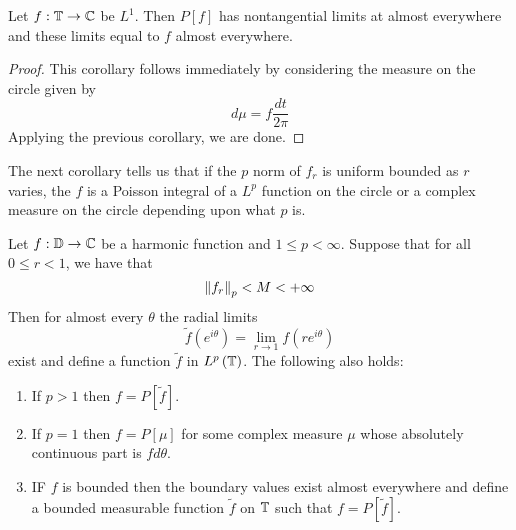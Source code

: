 \begin{corollary}
    Let $f : \mathbb T \to \mathbb C$ be $L^{1}$. Then $P[f]$ has nontangential limits at almost everywhere and these limits equal to $f$ almost everywhere.
    \label{cor:L1-implies-Poisson-limits}
\end{corollary}
\begin{proof}
    This corollary follows immediately by considering the measure on the circle given by
    \begin{equation*}
	d\mu = f \frac{dt}{2\pi}
    \end{equation*}
    Applying the previous corollary, we are done.
\end{proof}

The next corollary tells us that if the $p$ norm of $f_{r}$ is uniform bounded as $r$ varies, the $f$ is a Poisson integral of a $L^{p}$ function on the circle or a complex measure on the circle depending upon what $p$ is.
\begin{corollary}
    Let $f: \mathbb D \to \mathbb C$ be a harmonic function and $1\le p <\infty$. Suppose that for all $0\le r < 1$, we have that
    \begin{equation*}
	\left\lVert f_{r} \right\rVert_{p} < M< +\infty
    \end{equation*}
    Then for almost every $\theta$ the radial limits 
    \begin{equation*}
	\tilde {f} (e^{i\theta} ) = \lim_{r\to 1} f\left( re^{i\theta} \right)
    \end{equation*}
    exist and define a function $\tilde f$ in $L^{p} \left( \mathbb T \right)$. The following also holds:
    \begin{enumerate}
	\item If $p>1$ then $f=P[\tilde{f}]$.
	\item If $p=1$ then $f=P[\mu]$ for some complex measure $\mu$ whose absolutely continuous part is $fd\theta$.
	\item IF $f$ is bounded then the boundary values exist almost everywhere and define a bounded measurable function $\tilde{f}$ on $\mathbb T$ such that $f=P[\tilde{f}]$.
    \end{enumerate}
    \label{cor:imp-Fatou}
\end{corollary}



